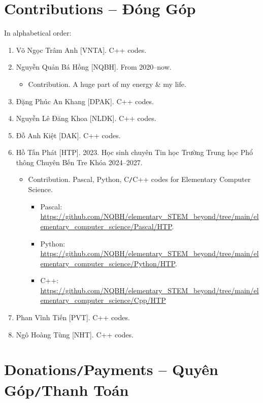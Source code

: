 \documentclass{article}
\begin{document}
\section{Contributions -- Đóng Góp}
In alphabetical order:
\begin{enumerate}
	\item {\sc Võ Ngọc Trâm Anh [VNTA].} C++ codes.
	\item {\sc Nguyễn Quản Bá Hồng [NQBH].} From 2020--now.
	\begin{itemize}
		\item {\sf Contribution.} A huge part of my energy \& my life.
	\end{itemize}
	\item {\sc Đặng Phúc An Khang [DPAK].} C++ codes.
	\item {\sc Nguyễn Lê Đăng Khoa [NLDK].} C++ codes.
	\item {\sc Đỗ Anh Kiệt [DAK].} C++ codes.
	\item {\sc Hồ Tấn Phát [HTP].} 2023. Học sinh chuyên Tin học Trường Trung học Phổ thông Chuyên Bến Tre Khóa 2024--2027.
	\begin{itemize}
		\item {\sf Contribution.} {\sf Pascal, Python, C{\tt/}C++} codes for Elementary Computer Science.
		\begin{itemize}
			\item {\sf Pascal}: \url{https://github.com/NQBH/elementary_STEM_beyond/tree/main/elementary_computer_science/Pascal/HTP}.
			\item {\sf Python}: \url{https://github.com/NQBH/elementary_STEM_beyond/tree/main/elementary_computer_science/Python/HTP}.
			\item {\sf C++}: \url{https://github.com/NQBH/elementary_STEM_beyond/tree/main/elementary_computer_science/Cpp/HTP}
		\end{itemize}		
	\end{itemize}
	\item {\sc Phan Vĩnh Tiến [PVT].} C++ codes.
	\item {\sc Ngô Hoàng Tùng [NHT]}. C++ codes.
\end{enumerate}


\section{Donations{\tt/}Payments -- Quyên Góp{\tt/}Thanh Toán}
\end{document}
